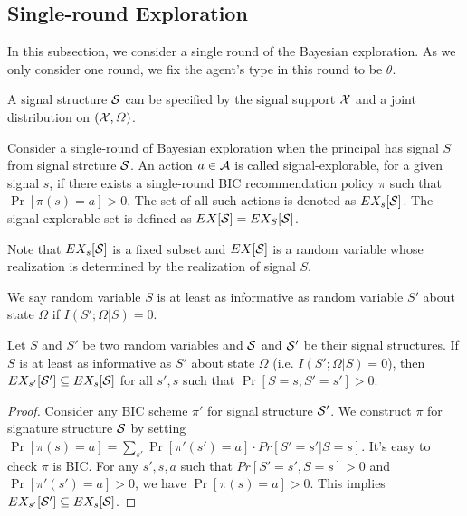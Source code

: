 \subsection{Single-round Exploration}
\label{sec:public_single}

In this subsection, we consider a single round of the Bayesian exploration. As we only consider one round, we fix the agent's type in this round to be $\theta$.

A signal structure $\S$ can be specified by the signal support $\X$ and a joint distribution on $(\X, \varOmega)$.  %
\begin{definition}
Consider a single-round of Bayesian exploration when the principal has signal $S$ from signal strcture $\S$. An action $a \in \A$ is called signal-explorable, for a given signal $s$, if there exists a single-round BIC recommendation policy $\pi$ such that $\Pr[\pi(s) = a] > 0$. The set of all such actions is denoted as $\EX_s[\S]$. The signal-explorable set is defined as $\EX[\S] = \EX_S[\S]$. 
\end{definition}

Note that $\EX_s[\S]$ is a fixed subset and $\EX[\S]$ is a random variable whose realization is determined by the realization of signal $S$. 

\begin{definition}
We say random variable $S$ is at least as informative as  random variable $S'$ about state $\Omega$ if $I(S' ; \Omega|S) = 0$. 
\end{definition}

\begin{lemma}
\label{lem:infomono}
Let $S$ and $S'$ be two random variables and $\S$ and $\S'$ be their signal structures. If $S$ is at least as informative as $S'$ about state $\Omega$ (i.e. $I(S' ; \Omega|S) = 0$), then $\EX_{s'}[\S'] \subseteq \EX_s[\S]$ for all $s' ,s$ such that $\Pr[S= s, S'= s'] > 0$. 
\end{lemma}

\begin{proof}
Consider any BIC scheme $\pi'$ for signal structure $\S'$. We construct $\pi$ for signature structure $\S$ by setting $\Pr[\pi(s) = a] = \sum_{s'} \Pr[\pi'(s') = a] \cdot Pr[S' = s'|S = s]$. It's easy to check $\pi$ is BIC. For any $s', s ,a$ such that $Pr[S' = s',S = s] >0 $ and $\Pr[\pi'(s') = a] >0$, we have $\Pr[\pi(s) = a] > 0$. This implies $\EX_{s'}[\S'] \subseteq \EX_s[\S]$. 
\end{proof}


